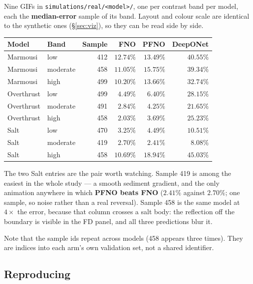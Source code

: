 \documentclass[11pt,a4paper]{article}
\begin{document}
Nine GIFs in \texttt{simulations/real/<model>/}, one per contrast band per
model, each the \textbf{median-error} sample of its band. Layout and colour
scale are identical to the synthetic ones (\S\ref{sec:viz}), so they can be read
side by side.

\begin{center}
\small
\begin{tabular}{llrrrr}
\toprule
\textbf{Model} & \textbf{Band} & \textbf{Sample} & \textbf{FNO} & \textbf{PFNO} & \textbf{DeepONet}\\
\midrule
Marmousi   & low      & 412 & $12.74\%$ & $13.49\%$ & $40.55\%$\\
Marmousi   & moderate & 458 & $11.05\%$ & $15.75\%$ & $39.34\%$\\
Marmousi   & high     & 499 & $10.20\%$ & $13.66\%$ & $32.74\%$\\
\midrule
Overthrust & low      & 499 & $4.49\%$  & $6.40\%$  & $28.15\%$\\
Overthrust & moderate & 491 & $2.84\%$  & $4.25\%$  & $21.65\%$\\
Overthrust & high     & 458 & $2.03\%$  & $3.69\%$  & $25.23\%$\\
\midrule
Salt       & low      & 470 & $3.25\%$  & $4.49\%$  & $10.51\%$\\
Salt       & moderate & 419 & $\mathbf{2.70\%}$ & $\mathbf{2.41\%}$ & $8.08\%$\\
Salt       & high     & 458 & $10.69\%$ & $18.94\%$ & $45.03\%$\\
\bottomrule
\end{tabular}
\end{center}

The two Salt entries are the pair worth watching. Sample 419 is among the
easiest in the whole study --- a smooth sediment gradient, and the only
animation anywhere in which \textbf{PFNO beats FNO} ($2.41\%$ against $2.70\%$;
one sample, so noise rather than a real reversal). Sample 458 is the same model
at $4\times$ the error, because that column crosses a salt body: the reflection
off the boundary is visible in the FD panel, and all three predictions blur it.

Note that the sample ids repeat across models (458 appears three times). They
are indices into each arm's own validation set, not a shared identifier.

\subsection{Reproducing}
\end{document}
